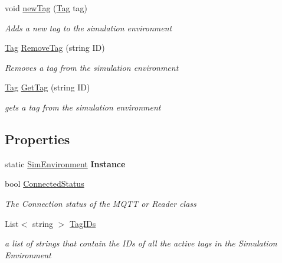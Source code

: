 \begin{DoxyCompactItemize}
void \hyperlink{class_pozyx_positioner_1_1_framework_1_1_sim_environment_ae804be21b53900cbac13c0cce385b170}{new\+Tag} (\hyperlink{class_pozyx_positioner_1_1_framework_1_1_tag}{Tag} tag)
\begin{DoxyCompactList}\small\item\em Adds a new tag to the simulation environment \end{DoxyCompactList}\item 
\hyperlink{class_pozyx_positioner_1_1_framework_1_1_tag}{Tag} \hyperlink{class_pozyx_positioner_1_1_framework_1_1_sim_environment_aa69448aa9bc85a646b57b753f5c5e483}{Remove\+Tag} (string ID)
\begin{DoxyCompactList}\small\item\em Removes a tag from the simulation environment \end{DoxyCompactList}\item 
\hyperlink{class_pozyx_positioner_1_1_framework_1_1_tag}{Tag} \hyperlink{class_pozyx_positioner_1_1_framework_1_1_sim_environment_a2163b3c6c4794224ceba0e5279b7ee8e}{Get\+Tag} (string ID)
\begin{DoxyCompactList}\small\item\em gets a tag from the simulation environment \end{DoxyCompactList}\end{DoxyCompactItemize}
\subsection*{Properties}
\begin{DoxyCompactItemize}
\item 
\mbox{\label{class_pozyx_positioner_1_1_framework_1_1_sim_environment_a099b83d9b2af93ae755b7bd081bef37c}} 
static \hyperlink{class_pozyx_positioner_1_1_framework_1_1_sim_environment}{Sim\+Environment} {\bfseries Instance}
\item 
bool \hyperlink{class_pozyx_positioner_1_1_framework_1_1_sim_environment_ae0d0d204695b423669bd6d0593d961aa}{Connected\+Status}
\begin{DoxyCompactList}\small\item\em The Connection status of the M\+Q\+TT or Reader class \end{DoxyCompactList}\item 
List$<$ string $>$ \hyperlink{class_pozyx_positioner_1_1_framework_1_1_sim_environment_af1e5db7ec810b6d92216b74c3eeb657a}{Tag\+I\+Ds}
\begin{DoxyCompactList}\small\item\em a list of strings that contain the I\+Ds of all the active tags in the Simulation Environment \end{DoxyCompactList}\end{DoxyCompactItemize}


